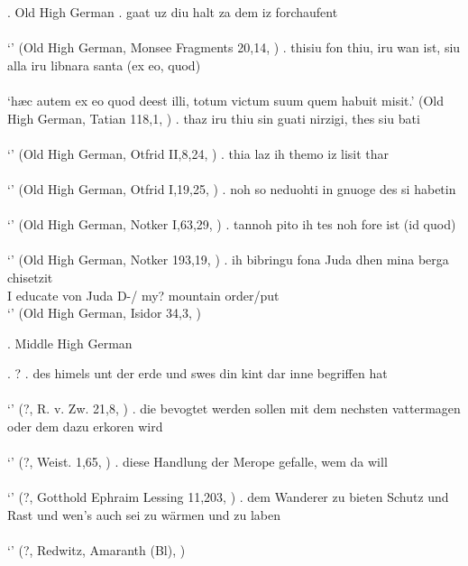 \ex. Old High German
\ag. gaat uz diu halt za dem iz forchaufent\\
 \\
 `' \hfill (Old High German, Monsee Fragments 20,14, \citealt[761]{behaghel1923})
\bg. thisiu fon thiu, iru wan ist, siu alla iru libnara santa (ex eo, quod)\\
 \\
 `hæc autem ex eo quod deest illi, totum victum suum quem habuit misit.' \hfill (Old High German, Tatian 118,1, \citealt[761]{behaghel1923})
\bg. thaz iru thiu sin guati nirzigi, thes siu bati\\
 \\
 `' \hfill (Old High German, Otfrid II,8,24, \citealt[761]{behaghel1923})
\bg. thia laz ih themo iz lisit thar\\
 \\
 `' \hfill (Old High German, Otfrid I,19,25, \citealt[761]{behaghel1923})
\bg. noh so neduohti in gnuoge des si habetin\\
 \\
 `' \hfill (Old High German, Notker I,63,29, \citealt[761]{behaghel1923})
\bg. tannoh pito ih tes noh fore ist (id quod)\\
 \\
 `' \hfill (Old High German, Notker 193,19, \citealt[761]{behaghel1923})
\bg. ih bibringu fona Juda dhen mina berga chisetzit\\
  I educate von Juda D-/ my? mountain order/put\\
  `' \hfill (Old High German, Isidor 34,3, \citealt[761]{behaghel1923})



\ex. Middle High German



\ex. ?
\ag. des himels unt der erde und swes din kint dar inne begriffen hat\\
 \\
 `' \hfill (?, R. v. Zw. 21,8, \citealt[761]{behaghel1923})
\bg. die bevogtet werden sollen mit dem nechsten vattermagen oder dem dazu erkoren wird\\
 \\
 `' \hfill (?, Weist. 1,65, \citealt[761]{behaghel1923})
\bg. diese Handlung der Merope gefalle, wem da will\\
 \\
 `' \hfill (?, Gotthold Ephraim Lessing 11,203, \citealt[761]{behaghel1923})
\bg. dem Wanderer zu bieten Schutz und Rast und wen's auch sei zu wärmen und zu laben\\
 \\
 `' \hfill (?, Redwitz, Amaranth (Bl), \citealt[761]{behaghel1923})





